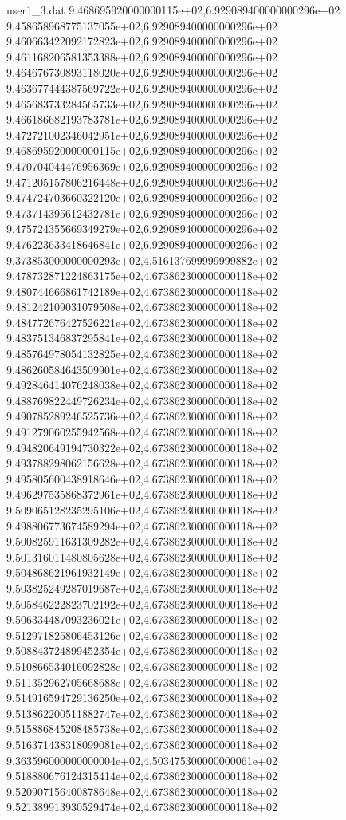 \begin{filecontents}{user1_3.dat}
9.468695920000000115e+02,6.929089400000000296e+02
9.458658968775137055e+02,6.929089400000000296e+02
9.460663422092172823e+02,6.929089400000000296e+02
9.461168206581353388e+02,6.929089400000000296e+02
9.464676730893118020e+02,6.929089400000000296e+02
9.463677444387569722e+02,6.929089400000000296e+02
9.465683733284565733e+02,6.929089400000000296e+02
9.466186682193783781e+02,6.929089400000000296e+02
9.472721002346042951e+02,6.929089400000000296e+02
9.468695920000000115e+02,6.929089400000000296e+02
9.470704044476956369e+02,6.929089400000000296e+02
9.471205157806216448e+02,6.929089400000000296e+02
9.474724703660322120e+02,6.929089400000000296e+02
9.473714395612432781e+02,6.929089400000000296e+02
9.475724355669349279e+02,6.929089400000000296e+02
9.476223633418646841e+02,6.929089400000000296e+02
9.373853000000000293e+02,4.516137699999999882e+02
9.478732871224863175e+02,4.673862300000000118e+02
9.480744666861742189e+02,4.673862300000000118e+02
9.481242109031079508e+02,4.673862300000000118e+02
9.484772676427526221e+02,4.673862300000000118e+02
9.483751346837295841e+02,4.673862300000000118e+02
9.485764978054132825e+02,4.673862300000000118e+02
9.486260584643509901e+02,4.673862300000000118e+02
9.492846414076248038e+02,4.673862300000000118e+02
9.488769822449726234e+02,4.673862300000000118e+02
9.490785289246525736e+02,4.673862300000000118e+02
9.491279060255942568e+02,4.673862300000000118e+02
9.494820649194730322e+02,4.673862300000000118e+02
9.493788298062156628e+02,4.673862300000000118e+02
9.495805600438918646e+02,4.673862300000000118e+02
9.496297535868372961e+02,4.673862300000000118e+02
9.509065128235295106e+02,4.673862300000000118e+02
9.498806773674589294e+02,4.673862300000000118e+02
9.500825911631309282e+02,4.673862300000000118e+02
9.501316011480805628e+02,4.673862300000000118e+02
9.504868621961932149e+02,4.673862300000000118e+02
9.503825249287019687e+02,4.673862300000000118e+02
9.505846222823702192e+02,4.673862300000000118e+02
9.506334487093236021e+02,4.673862300000000118e+02
9.512971825806453126e+02,4.673862300000000118e+02
9.508843724899452354e+02,4.673862300000000118e+02
9.510866534016092828e+02,4.673862300000000118e+02
9.511352962705668688e+02,4.673862300000000118e+02
9.514916594729136250e+02,4.673862300000000118e+02
9.513862200511882747e+02,4.673862300000000118e+02
9.515886845208485738e+02,4.673862300000000118e+02
9.516371438318099081e+02,4.673862300000000118e+02
9.363596000000000004e+02,4.503475300000000061e+02
9.518880676124315414e+02,4.673862300000000118e+02
9.520907156400878648e+02,4.673862300000000118e+02
9.521389913930529474e+02,4.673862300000000118e+02

\end{filecontents}
